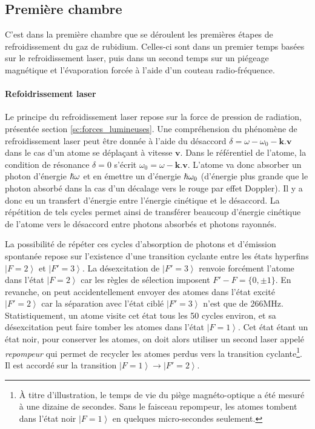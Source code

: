 \subsection{Première chambre}
C'est dans la première chambre que se déroulent les premières étapes de refroidissement du gaz de rubidium. Celles-ci sont dans un premier temps basées sur le refroidissement laser, puis dans un second temps sur un piégeage magnétique et l'évaporation forcée à l'aide d'un couteau radio-fréquence.

\paragraph*{Refoidrissement laser}
Le principe du refroidissement laser repose sur la force de pression de radiation, présentée section \ref{sc:forces_lumineuses}. Une compréhension du phénomène de refroidissement laser peut être donnée à l'aide du désaccord $\delta=\omega-\omega_0- \mathbf{k}. \mathbf{v}$ dans le cas d'un atome se déplaçant à vitesse $\mathbf{v}$.
Dans le référentiel de l'atome, la condition de résonance $\delta=0$ s'écrit $\omega_0=\omega-\mathbf{k}.\mathbf{v}$. L'atome va donc absorber un photon d'énergie $\hslash \omega$ et en émettre un d'énergie $\hslash \omega_0$ (d'énergie plus grande que le photon absorbé dans la cas d'un décalage vers le rouge par effet Doppler). Il y a donc eu un transfert d'énergie entre l'énergie cinétique et le désaccord. La répétition de tels cycles permet ainsi de transférer beaucoup d'énergie cinétique de l'atome vers le désaccord entre photons absorbés et photons rayonnés.

La possibilité de répéter ces cycles d'absorption de photons et d'émission spontanée repose sur l'existence d'une transition cyclante entre les états hyperfins $\left| F=2 \right\rangle$ et $\left| F'=3 \right\rangle$. La désexcitation de $\left|F'=3\right\rangle$ renvoie forcément l'atome dans l'état $\left| F=2 \right\rangle$ car les règles de sélection imposent $F'-F= \lbrace 0, \pm 1 \rbrace$.
En revanche, on peut accidentellement envoyer des atomes dans l'état excité $\left| F'=2 \right\rangle$ car la séparation avec l'état ciblé $\left| F'=3 \right\rangle$ n'est que de 266MHz. Statistiquement, un atome visite cet état tous les 50 cycles environ, et sa désexcitation peut faire tomber les atomes dans l'état $\left|F=1\right\rangle$. Cet état étant un état noir, pour conserver les atomes, on doit alors utiliser un second laser appelé \emph{repompeur} qui permet de recycler les atomes perdus vers la transition cyclante\footnote{À titre d'illustration, le temps de vie du piège magnéto-optique a été mesuré à une dizaine de secondes. Sans le faisceau repompeur, les atomes tombent dans l'état noir $\left| F=1 \right\rangle$ en quelques micro-secondes seulement.}. Il est accordé sur la transition $\left| F=1 \right\rangle \rightarrow \left| F'=2 \right\rangle$.

